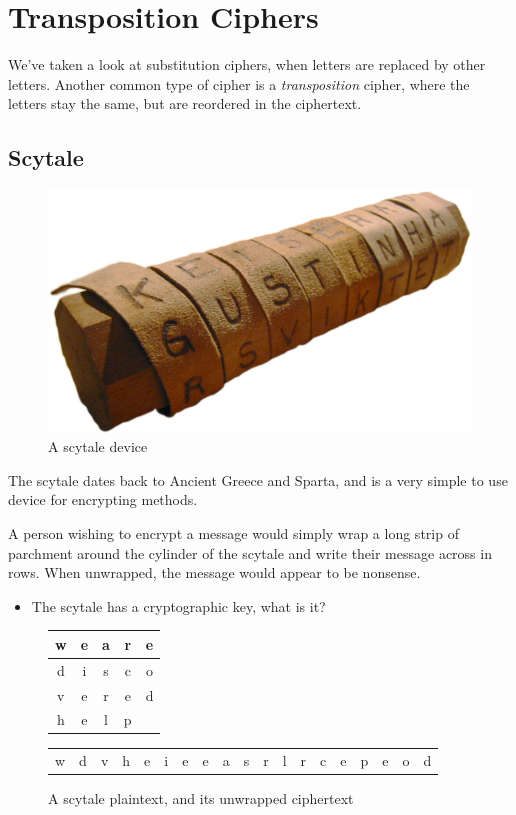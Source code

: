 \section{Transposition Ciphers}

	We've taken a look at substitution ciphers, when letters are replaced by other letters. Another common type of cipher is a \textit{transposition} cipher, where the letters stay the same, but are reordered in the ciphertext.

\subsection{Scytale}

	\begin{figure}[h]
		\centering
		\includegraphics[width=0.7\linewidth]{McrRaspJam/016_Ciphers/3_transposition/Scytale}
		\caption{A scytale device}
		\label{fig:scytale}
	\end{figure}
	
	The scytale dates back to Ancient Greece and Sparta, and is a very simple to use device for encrypting methods.
	
	A person wishing to encrypt a message would simply wrap a long strip of parchment around the cylinder of the scytale and write their message across in rows. When unwrapped, the message would appear to be nonsense.
	
	\begin{itemize}[nosep]
		\item The scytale has a cryptographic key, what is it?
	\end{itemize}
	
	\begin{figure}[h]
		\centering
		
		\begin{tabular}{c|c|c|c|c}
			w & e & a & r & e \\ 
			\hline 
			d & i & s & c & o \\ 
			\hline 
			v & e & r & e & d \\ 
			\hline 
			h & e & l & p &  \\
		\end{tabular}
	
		\vspace{4pt}
		
		\begin{tabular}{ccccccccccccccccccc}
			w & d & v & h & e & i & e & e & a & s & r & l & r & c & e & p & e & o & d \\ 
		\end{tabular} 
	
		\caption{A scytale plaintext, and its unwrapped ciphertext}
		\label{fig:scytaletable}
	\end{figure}